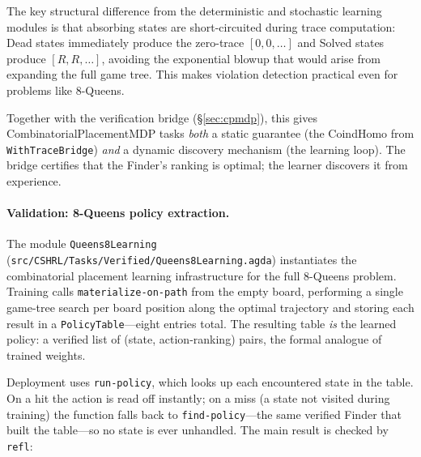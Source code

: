 \documentclass[9pt,a4paper]{article}
\newcommand{\fpath}[1]{\nolinkurl{#1}}
\theoremstyle{plain}
\theoremstyle{definition}
\theoremstyle{remark}
\begin{document}
The key structural difference from the deterministic and stochastic learning
modules is that absorbing states are short-circuited during trace computation:
Dead states immediately produce the zero-trace $[0,0,\ldots]$ and Solved states
produce $[R,R,\ldots]$, avoiding the exponential blowup that would arise from
expanding the full game tree.  This makes violation detection practical even for
problems like 8-Queens.

Together with the verification bridge (\S\ref{sec:cpmdp}), this gives
CombinatorialPlacementMDP tasks \emph{both} a static guarantee (the CoindHomo
from \texttt{WithTraceBridge}) \emph{and} a dynamic discovery mechanism (the
learning loop).  The bridge certifies that the Finder's ranking is optimal; the
learner discovers it from experience.

\paragraph{Validation: 8-Queens policy extraction.}
\begin{sloppypar}
The module \texttt{Queens8Learning}
(\fpath{src/CSHRL/Tasks/Verified/Queens8Learning.agda})
instantiates the combinatorial placement learning infrastructure for
the full $8$-Queens problem.  Training calls
\texttt{materialize-on-path} from the empty board, performing a single
game-tree search per board position along the optimal trajectory and
storing each result in a \texttt{PolicyTable}---eight entries total.
The resulting table \emph{is} the learned policy: a verified list of
(state, action-ranking) pairs, the formal analogue of trained weights.
\end{sloppypar}

Deployment uses \texttt{run-policy}, which looks up each encountered
state in the table.  On a hit the action is read off instantly; on a
miss (a state not visited during training) the function falls back to
\texttt{find-policy}---the same verified Finder that built the
table---so no state is ever unhandled.  The main result is checked by
\texttt{refl}:
\end{document}

